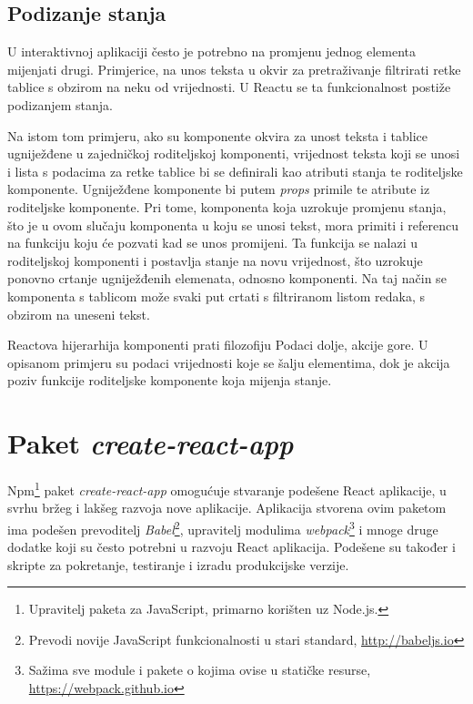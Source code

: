 \documentclass[times, utf8, zavrsni, numeric]{fer}
\begin{document}
\subsection{Podizanje stanja} \label{sec:lifting_state}

U interaktivnoj aplikaciji često je potrebno na promjenu jednog elementa mijenjati drugi.
Primjerice, na unos teksta u okvir za pretraživanje filtrirati retke tablice s obzirom na neku od vrijednosti.
U Reactu se ta funkcionalnost postiže podizanjem stanja\citep{reactDocsLiftStateUp}.

Na istom tom primjeru, ako su komponente okvira za unost teksta i tablice ugniježđene u zajedničkoj roditeljskoj komponenti, vrijednost teksta koji se unosi i lista s podacima za retke tablice bi se definirali kao atributi stanja te roditeljske komponente.
Ugniježđene komponente bi putem \emph{props} primile te atribute iz roditeljske komponente.
Pri tome, komponenta koja uzrokuje promjenu stanja, što je u ovom slučaju komponenta u koju se unosi tekst, mora primiti i referencu na funkciju koju će pozvati kad se unos promijeni.
Ta funkcija se nalazi u roditeljskoj komponenti i postavlja stanje na novu vrijednost, što uzrokuje ponovno crtanje ugniježđenih elemenata, odnosno komponenti.
Na taj način se komponenta s tablicom može svaki put crtati s filtriranom listom redaka, s obzirom na uneseni tekst.

Reactova hijerarhija komponenti prati filozofiju \glqq Podaci dolje, akcije gore\grqq \break {}.
U opisanom primjeru su podaci vrijednosti koje se šalju elementima, dok je akcija poziv funkcije roditeljske komponente koja mijenja stanje.

\newpage


\section{Paket \emph{create-react-app}}

Npm\footnote{Upravitelj paketa za JavaScript, primarno korišten uz Node.js.} paket \emph{create-react-app} omogućuje stvaranje podešene React aplikacije, u svrhu bržeg i lakšeg razvoja nove aplikacije.
Aplikacija stvorena ovim paketom ima podešen prevoditelj \emph{Babel}\footnote{Prevodi novije JavaScript funkcionalnosti u stari standard, \url{http://babeljs.io} }, upravitelj modulima \emph{webpack}\footnote{Sažima sve module i pakete o kojima ovise u statičke resurse, \url{https://webpack.github.io} } i mnoge druge dodatke koji su često potrebni u razvoju React aplikacija\citep{createReactAppGithub}.
Podešene su također i skripte za pokretanje, testiranje i izradu produkcijske verzije.
\end{document}
